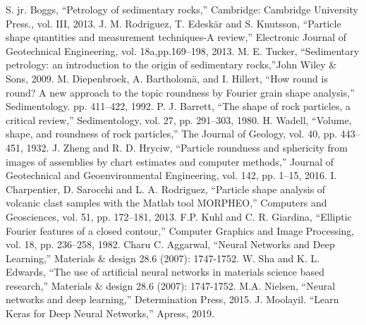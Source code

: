 \documentclass[conference]{IEEEtran}
\begin{document}
	
\begin{thebibliography}{plain}
 S. jr. Boggs, ``Petrology of sedimentary rocks,'' Cambridge: Cambridge University Press., vol. III, 2013.
 J. M. Rodriguez, T. Edesk{\"{a}}r and S. Knutsson, ``Particle shape quantities and measurement techniques-A review,'' Electronic Journal of Geotechnical Engineering, vol. 18a,pp.169--198, 2013.
 M. E. Tucker, ``Sedimentary petrology: an introduction to the origin of sedimentary rocks,''John Wiley \& Sons, 2009.
 M. Diepenbroek, A. Bartholom{\"{a}}, and I. Hillert, ``How round is round? A new approach to the topic  roundness by Fourier grain shape analysis,'' Sedimentology. pp. 411--422, 1992.
 P. J. Barrett, ``The shape of rock particles, a critical review,'' Sedimentology, vol. 27, pp. 291--303, 1980.
 H. Wadell, ``Volume, shape, and roundness of rock particles,'' The Journal of Geology, vol. 40, pp. 443--451, 1932.
 J. Zheng and R. D. Hryciw, ``Particle roundness and sphericity from images of assemblies by chart estimates and computer methods,'' Journal of Geotechnical and Geoenvironmental Engineering, vol. 142, pp. 1--15, 2016.
 I. Charpentier,  D. Sarocchi  and L. A. Rodriguez, ``Particle shape analysis of volcanic clast samples with the Matlab tool MORPHEO,'' Computers and Geosciences, vol. 51, pp. 172--181, 2013.
 F.P. Kuhl and C. R. Giardina, ``Elliptic Fourier features of a closed contour,'' Computer Graphics and Image Processing, vol. 18, pp. 236--258, 1982.
  Charu C. Aggarwal, ``Neural Networks and Deep Learning,'' Materials \& design 28.6 (2007): 1747-1752.
 W. Sha and K. L. Edwards, ``The use of artificial neural networks in materials science based research,'' Materials \& design 28.6 (2007): 1747-1752.
 M.A. Nielsen, ``Neural networks and deep learning,'' Determination Press, 2015.
 J. Moolayil. ``Learn Keras for Deep Neural Networks,'' Apress, 2019.

\end{thebibliography}

\end{document}
